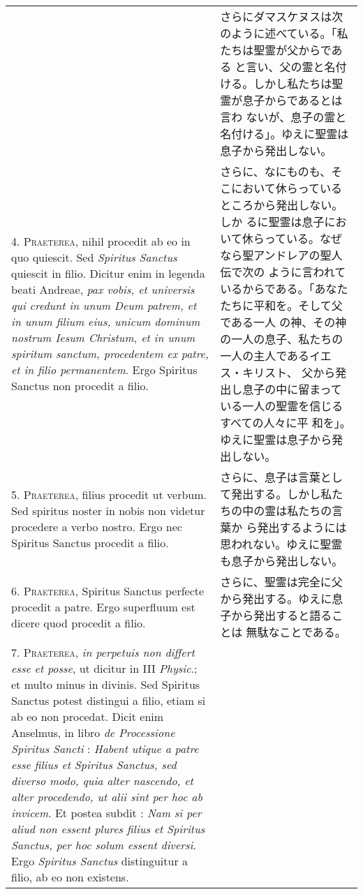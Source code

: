 \documentclass[10pt]{jsarticle} %
\begin{document}
\begin{longtable}{p{21em}p{21em}}
&

さらにダマスケヌスは次のように述べている。「私たちは聖霊が父からである
 と言い、父の霊と名付ける。しかし私たちは聖霊が息子からであるとは言わ
 ないが、息子の霊と名付ける」。ゆえに聖霊は息子から発出しない。


\\



4. {\scshape Praeterea}, nihil procedit ab eo in quo quiescit. Sed {\itshape
Spiritus Sanctus} quiescit in filio. Dicitur enim in legenda beati
Andreae, {\itshape pax vobis, et universis qui credunt in unum Deum patrem, et
in unum filium eius, unicum dominum nostrum Iesum Christum, et in unum
spiritum sanctum, procedentem ex patre, et in filio permanentem}. Ergo
Spiritus Sanctus non procedit a filio.

&

さらに、なにものも、そこにおいて休らっているところから発出しない。しか
るに聖霊は息子において休らっている。なぜなら聖アンドレアの聖人伝で次の
 ように言われているからである。「あなたたちに平和を。そして父である一人
 の神、その神の一人の息子、私たちの一人の主人であるイエス・キリスト、
 父から発出し息子の中に留まっている一人の聖霊を信じるすべての人々に平
 和を」。ゆえに聖霊は息子から発出しない。

\\



5. {\scshape Praeterea}, filius procedit ut verbum. Sed spiritus noster in nobis non
videtur procedere a verbo nostro. Ergo nec Spiritus Sanctus
procedit a filio.

&

さらに、息子は言葉として発出する。しかし私たちの中の霊は私たちの言葉か
 ら発出するようには思われない。ゆえに聖霊も息子から発出しない。

\\



6. {\scshape Praeterea},  Spiritus Sanctus perfecte procedit a patre. Ergo
superfluum est dicere quod procedit a filio.

&

さらに、聖霊は完全に父から発出する。ゆえに息子から発出すると語ることは
 無駄なことである。

\\


7. {\scshape Praeterea}, {\itshape in perpetuis non differt esse et posse}, ut dicitur in III
{\itshape Physic}.; et multo minus in divinis. Sed Spiritus Sanctus
potest distingui a filio, etiam si ab eo non procedat. Dicit enim
Anselmus, in libro {\itshape de Processione Spiritus Sancti} : {\itshape Habent utique a
patre esse filius et {\itshape Spiritus Sanctus}, sed diverso modo,
quia alter nascendo, et alter procedendo, ut alii sint per hoc ab
invicem}. Et postea subdit : {\itshape Nam si per aliud non essent plures filius
et Spiritus Sanctus, per hoc solum essent diversi}. Ergo
{\itshape Spiritus Sanctus} distinguitur a filio, ab eo non existens.


\end{longtable}
\end{document}
